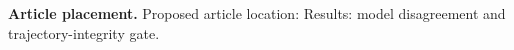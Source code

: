 \textbf{Article placement.} Proposed article location: Results: model disagreement and trajectory-integrity gate.
